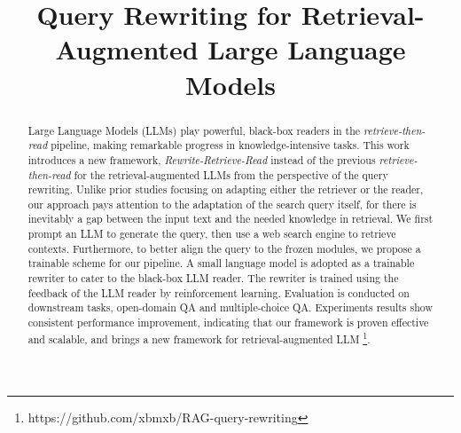 \title{Query Rewriting for Retrieval-Augmented Large Language Models}



\maketitle
\begin{abstract}
Large Language Models (LLMs) play powerful, black-box readers in the \textit{retrieve-then-read} pipeline, making remarkable progress in knowledge-intensive tasks.
This work introduces a new framework, \textit{Rewrite-Retrieve-Read} instead of the previous \textit{retrieve-then-read} for the retrieval-augmented LLMs from the perspective of the query rewriting.
Unlike prior studies focusing on adapting either the retriever or the reader, our approach pays attention to the adaptation of the search query itself, for there is inevitably a gap between the input text and the needed knowledge in retrieval.
We first prompt an LLM to generate the query, then use a web search engine to retrieve contexts.
Furthermore, to better align the query to the frozen modules, we propose a trainable scheme for our pipeline.
A small language model is adopted as a trainable rewriter to cater to the black-box LLM reader.
The rewriter is trained using the feedback of the LLM reader by reinforcement learning.
Evaluation is conducted on downstream tasks, open-domain QA and multiple-choice QA. 
Experiments results show consistent performance improvement, indicating that our framework is proven effective and scalable, and brings a new framework for retrieval-augmented LLM \footnote{https://github.com/xbmxb/RAG-query-rewriting}.
\end{abstract}

